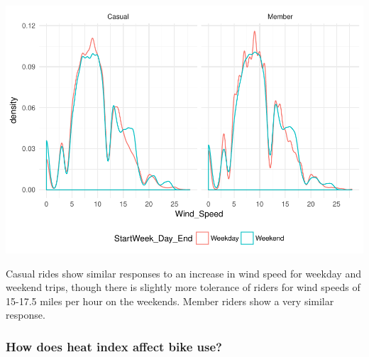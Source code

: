 \documentclass[]{article}
\newenvironment{Shaded}{\begin{snugshade}}{\end{snugshade}}
\newcommand{\KeywordTok}[1]{\textcolor[rgb]{0.13,0.29,0.53}{\textbf{#1}}}
\newcommand{\DataTypeTok}[1]{\textcolor[rgb]{0.13,0.29,0.53}{#1}}
\newcommand{\DecValTok}[1]{\textcolor[rgb]{0.00,0.00,0.81}{#1}}
\newcommand{\FloatTok}[1]{\textcolor[rgb]{0.00,0.00,0.81}{#1}}
\newcommand{\StringTok}[1]{\textcolor[rgb]{0.31,0.60,0.02}{#1}}
\newcommand{\CommentTok}[1]{\textcolor[rgb]{0.56,0.35,0.01}{\textit{#1}}}
\newcommand{\OperatorTok}[1]{\textcolor[rgb]{0.81,0.36,0.00}{\textbf{#1}}}
\newcommand{\NormalTok}[1]{#1}
\begin{document}
\begin{Shaded}
\end{Shaded}

\includegraphics{Nice_Ride_Project_Stat_ReportDRAFT_files/figure-latex/unnamed-chunk-14-3.pdf}

Casual rides show similar responses to an increase in wind speed for
weekday and weekend trips, though there is slightly more tolerance of
riders for wind speeds of 15-17.5 miles per hour on the weekends. Member
riders show a very similar response.

\subsubsection{How does heat index affect bike
use?}\label{how-does-heat-index-affect-bike-use}
\end{document}
